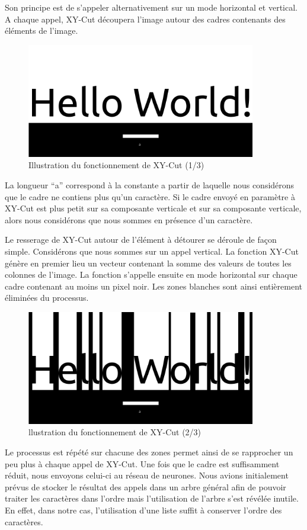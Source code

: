 \documentclass[11pt]{report}
\begin{document}
Son principe est de s'appeler alternativement sur un mode horizontal et vertical. A chaque appel, XY-Cut découpera l'image autour des cadres contenants des éléments de l'image.

\begin{figure}[htbp]
\centering
\includegraphics[width=10cm]{1.png}
\caption{Illustration du fonctionnement de XY-Cut (1/3)}
\end{figure}

La longueur ``a'' correspond à la constante a partir de laquelle nous considérons que le cadre ne contiens plus qu'un caractère. Si le cadre envoyé en paramètre à XY-Cut est plus petit sur sa composante verticale et sur sa composante verticale, alors nous considérons que nous sommes en présence d'un caractère.

Le resserage de XY-Cut autour de l'élément à détourer se déroule de façon simple. Considérons que nous sommes sur un appel vertical. La fonction XY-Cut génère en premier lieu un vecteur contenant la somme des valeurs de toutes les colonnes de l'image. La fonction s'appelle ensuite en mode horizontal sur chaque cadre contenant au moins un pixel noir. Les zones blanches sont ainsi entièrement éliminées du processus.

\begin{figure}[htbp]
\centering
\includegraphics[width=10cm]{2.png}
\caption{llustration du fonctionnement de XY-Cut (2/3)}
\end{figure}

Le processus est répété sur chacune des zones permet ainsi de se rapprocher un peu plus à chaque appel de XY-Cut. Une fois que le cadre est suffisamment réduit, nous envoyons celui-ci au réseau de neurones. Nous avions initialement prévus de stocker le résultat des appels dans un arbre général afin de pouvoir traiter les caractères dans l'ordre mais l'utilisation de l'arbre s'est révélée inutile. En effet, dans notre cas, l'utilisation d'une liste suffit à conserver l'ordre des caractères.
\end{document}
